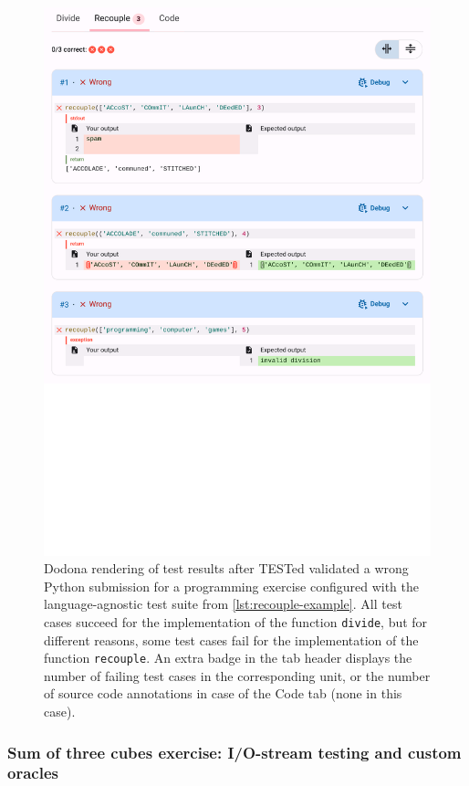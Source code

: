 \documentclass[../main]{subfiles}
\begin{document}
\begin{figure}
    \centering
    \includegraphics[width=\textwidth]{render-recouple}
    \caption{Dodona rendering of test results after TESTed validated a wrong Python submission for a programming exercise configured with the language-agnostic test suite from \vref{lst:recouple-example}. All test cases succeed for the implementation of the function \texttt{divide}, but for different reasons, some test cases fail for the implementation of the function \texttt{recouple}. An extra badge in the tab header displays the number of failing test cases in the corresponding unit, or the number of source code annotations in case of the Code tab (none in this case).\label{fig:dodona-render-recouple}}
\end{figure}

\subsubsection{Sum of three cubes exercise: I/O-stream testing and custom oracles}\label{subsubsec:sum-of-three-cubes-exercise:-i/o-stream-testing-and-custom-oracles}
\end{document}
